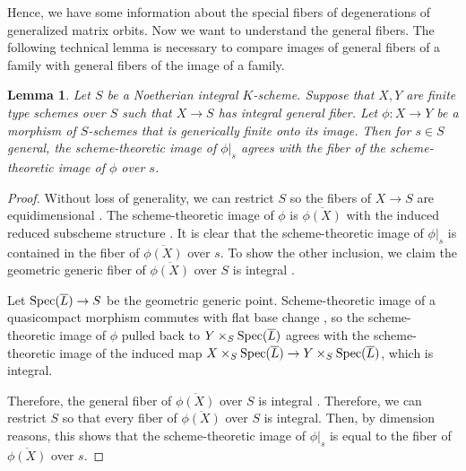 \documentclass[12pt]{amsart}
\newcommand{\Spec}{{\rm Spec}}
\theoremstyle{plain}
\newtheorem{Lem}[Thm]{Lemma}
\theoremstyle{definition}
\theoremstyle{remark}
\begin{document}
Hence, we have some information about the special fibers of degenerations of generalized matrix orbits. Now we want to understand the general fibers. The following technical lemma is necessary to compare images of general fibers of a family with general fibers of the image of a family.

\begin{Lem}\label{simage}
Let $S$ be a Noetherian integral $K$-scheme. Suppose that $X,Y$ are finite type schemes over $S$ such that $X\to S$ has integral general fiber. Let $\phi: X\to Y$ be a morphism of $S$-schemes that is generically finite onto its image. Then for $s\in S$ general, the scheme-theoretic image of $\phi|_{s}$ agrees with the fiber of the scheme-theoretic image of $\phi$ over $s$. 
\end{Lem}
\begin{proof}
Without loss of generality, we can restrict $S$ so the fibers of $X\to S$ are equidimensional \cite[Tag 05F7]{stacks-project}. The scheme-theoretic image of $\phi$ is $\overline{\phi(X)}$ with the induced reduced subscheme structure \cite[Tag 056B]{stacks-project}. It is clear that the scheme-theoretic image of $\phi|_{s}$ is contained in the fiber of $\overline{\phi(X)}$  over $s$. To show the other inclusion, we claim the geometric generic fiber of $\overline{\phi(X)}$ over $S$ is integral \cite[IV 12.1.1 (x)]{EGA}. 

Let $\Spec(\overline{L})\to S$ be the geometric generic point. Scheme-theoretic image of a quasicompact morphism commutes with flat base change \cite[Tag 081I]{stacks-project}, so the scheme-theoretic image of $\phi$ pulled back to $Y\times_S \Spec(\overline{L})$ agrees with the scheme-theoretic image of the induced map $X\times_S\Spec(\overline{L})\to Y\times_S \Spec(\overline{L})$, which is integral.  

Therefore, the general fiber of $\overline{\phi(X)}$ over $S$ is integral \cite[Tag 0551]{stacks-project}. Therefore, we can restrict $S$ so that every fiber of $\overline{\phi(X)}$ over $S$ is integral. Then, by dimension reasons, this shows that the scheme-theoretic image of $\phi|_{s}$ is equal to the fiber of $\overline{\phi(X)}$  over $s$.
\end{proof}
\end{document}
